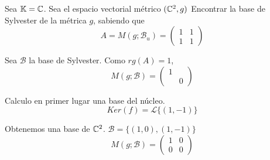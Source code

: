 \begin{ejemplo}
    Sea $\mathbb{K}=\mathbb{C}$. Sea el espacio vectorial métrico $(\mathbb{C}^2, g)$ Encontrar la base de Sylvester de la métrica $g$, sabiendo que
    \begin{equation*}
        A = M(g; \mathcal{B}_u) = \left( \begin{array}{cc}
            1 & 1 \\
            1 & 1
        \end{array} \right)
    \end{equation*}

    Sea $\mathcal{B}$ la base de Sylvester. Como $rg(A) = 1$,
    \begin{equation*}
        M(g; \mathcal{B}) = \left( \begin{array}{cc}
            1 &  \\
             & 0
        \end{array} \right)
    \end{equation*}

    Calculo en primer lugar una base del núcleo.
    \begin{equation*}
        Ker(f) = \mathcal{L}\{(1, -1)\}
    \end{equation*}

    Obtenemos una base de $\mathbb{C}^2$. $\mathcal{B}=\{(1,0), (1, -1)\}$
    \begin{equation*}
        M(g; \mathcal{B}) = \left( \begin{array}{cc}
            1 & 0 \\
            0 & 0
        \end{array} \right)
    \end{equation*}
\end{ejemplo}


